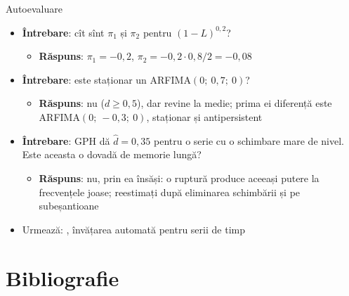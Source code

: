 \begin{frame}{Autoevaluare}
\itemsize{\small}
\begin{itemize}
    \item \textbf{Întrebare}: cît sînt $\pi_1$ și $\pi_2$ pentru $(1-L)^{0{,}2}$?
    \begin{itemize}
        \item \textbf{Răspuns}: $\pi_1 = -0{,}2$, $\pi_2 = -0{,}2 \cdot 0{,}8/2 = -0{,}08$
    \end{itemize}
    \item \textbf{Întrebare}: este staționar un ARFIMA$(0;\ 0{,}7;\ 0)$?
    \begin{itemize}
        \item \textbf{Răspuns}: nu ($d \ge 0{,}5$), dar revine la medie; prima ei diferență este ARFIMA$(0;\ -0{,}3;\ 0)$, staționar și antipersistent
    \end{itemize}
    \item \textbf{Întrebare}: GPH dă $\hat d = 0{,}35$ pentru o serie cu o schimbare mare de nivel. Este aceasta o dovadă de memorie lungă?
    \begin{itemize}
        \item \textbf{Răspuns}: nu, prin ea însăși: o ruptură produce aceeași putere la frecvențele joase; reestimați după eliminarea schimbării și pe subeșantioane
    \end{itemize}
    \item Urmează: , învățarea automată pentru serii de timp
\end{itemize}
\end{frame}


\section{Bibliografie}

